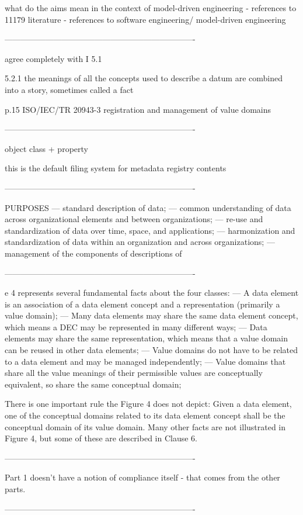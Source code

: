 what do the aims mean in the context of model-driven engineering 
 - references to 11179 literature 
 - references to software engineering/ model-driven engineering 

----------------------------------------------------------------------

agree completely with I 5.1 

5.2.1 the meanings of all the concepts used to describe a datum are
combined into a story, sometimes called a fact 

p.15 ISO/IEC/TR 20943-3 registration and management of value domains

----------------------------------------------------------------------

object class + property 

this is the default filing system for metadata registry contents 

----------------------------------------------------------------------

PURPOSES
— standard description of data;
— common understanding of data across organizational elements and between organizations;
— re-use and standardization of data over time, space, and applications;
— harmonization and standardization of data within an organization and across organizations;
— management of the components of descriptions of 

----------------------------------------------------------------------

e 4 represents several fundamental facts about the four classes:
— A data element is an association of a data element concept and a representation (primarily a
value domain);
 — Many data elements may share the same data element concept, which means a DEC may be represented in many different ways;
— Data elements may share the same representation, which means that a value domain can be reused in other data elements;
— Value domains do not have to be related to a data element and may be managed independently;
— Value domains that share all the value meanings of their permissible
values are conceptually equivalent, so share the same conceptual
domain;

There is one important rule the Figure 4 does not depict: Given a data element, one of the conceptual domains related to its data element concept shall be the conceptual domain of its value domain.
Many other facts are not illustrated in Figure 4, but some of these
are described in Clause 6. 

----------------------------------------------------------------------

Part 1 doesn't have a notion of compliance itself - that comes from
the other parts. 

----------------------------------------------------------------------


